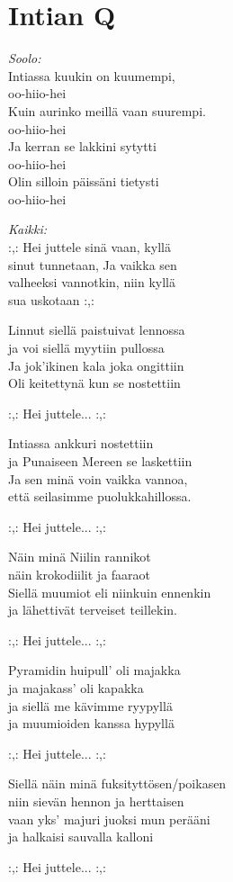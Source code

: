 \section{Intian Q}

\textit{Soolo:}\\
Intiassa kuukin on kuumempi,\\
oo-hiio-hei\\
Kuin aurinko meillä vaan suurempi.\\
oo-hiio-hei\\
Ja kerran se lakkini sytytti\\
oo-hiio-hei\\
Olin silloin päissäni tietysti\\
oo-hiio-hei

\textit{Kaikki:}\\
:,: Hei juttele sinä vaan, kyllä\\
sinut tunnetaan, Ja vaikka sen\\
valheeksi vannotkin, niin kyllä\\
sua uskotaan :,:


Linnut siellä paistuivat lennossa\\
ja voi siellä myytiin pullossa\\
Ja jok’ikinen kala joka ongittiin\\
Oli keitettynä kun se nostettiin


:,: Hei juttele... :,:


Intiassa ankkuri nostettiin\\
ja Punaiseen Mereen se laskettiin\\
Ja sen minä voin vaikka vannoa,\\
että seilasimme puolukkahillossa.


:,: Hei juttele... :,:


Näin minä Niilin rannikot\\
näin krokodiilit ja faaraot\\
Siellä muumiot eli niinkuin ennenkin\\
ja lähettivät terveiset teillekin.


:,: Hei juttele... :,:


Pyramidin huipull' oli majakka\\
ja majakass' oli kapakka\\
ja siellä me kävimme ryypyllä\\
ja muumioiden kanssa hypyllä


:,: Hei juttele... :,:


Siellä näin minä fuksityttösen/poikasen\\
niin sievän hennon ja herttaisen\\
vaan yks' majuri juoksi mun perääni\\
ja halkaisi sauvalla kalloni


:,: Hei juttele... :,: